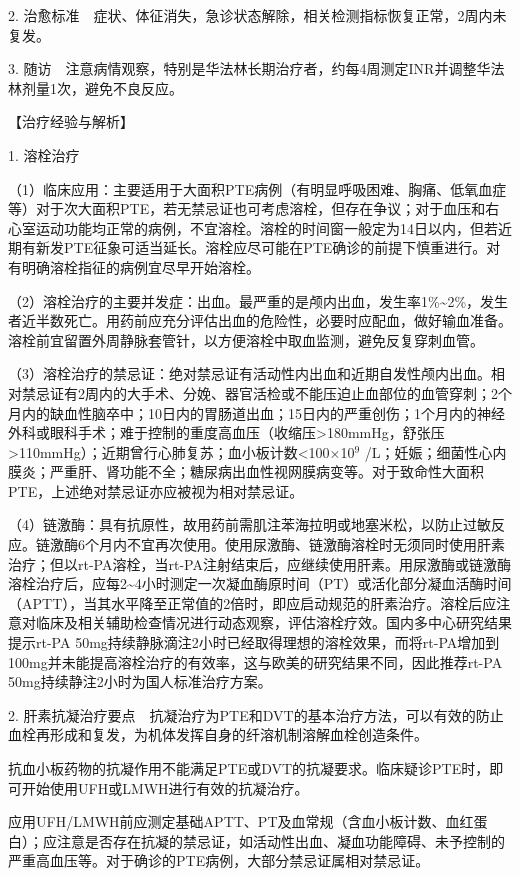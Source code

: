 2.
治愈标准　症状、体征消失，急诊状态解除，相关检测指标恢复正常，2周内未复发。

3.
随访　注意病情观察，特别是华法林长期治疗者，约每4周测定INR并调整华法林剂量1次，避免不良反应。

【治疗经验与解析】

1. 溶栓治疗

（1）临床应用：主要适用于大面积PTE病例（有明显呼吸困难、胸痛、低氧血症等）对于次大面积PTE，若无禁忌证也可考虑溶栓，但存在争议；对于血压和右心室运动功能均正常的病例，不宜溶栓。溶栓的时间窗一般定为14日以内，但若近期有新发PTE征象可适当延长。溶栓应尽可能在PTE确诊的前提下慎重进行。对有明确溶栓指征的病例宜尽早开始溶栓。

（2）溶栓治疗的主要并发症：出血。最严重的是颅内出血，发生率1\%\textasciitilde{}2\%，发生者近半数死亡。用药前应充分评估出血的危险性，必要时应配血，做好输血准备。溶栓前宜留置外周静脉套管针，以方便溶栓中取血监测，避免反复穿刺血管。

（3）溶栓治疗的禁忌证：绝对禁忌证有活动性内出血和近期自发性颅内出血。相对禁忌证有2周内的大手术、分娩、器官活检或不能压迫止血部位的血管穿刺；2个月内的缺血性脑卒中；10日内的胃肠道出血；15日内的严重创伤；1个月内的神经外科或眼科手术；难于控制的重度高血压（收缩压\textgreater{}180mmHg，舒张压\textgreater{}110mmHg）；近期曾行心肺复苏；血小板计数\textless{}100×10$^{9}$
/L；妊娠；细菌性心内膜炎；严重肝、肾功能不全；糖尿病出血性视网膜病变等。对于致命性大面积PTE，上述绝对禁忌证亦应被视为相对禁忌证。

（4）链激酶：具有抗原性，故用药前需肌注苯海拉明或地塞米松，以防止过敏反应。链激酶6个月内不宜再次使用。使用尿激酶、链激酶溶栓时无须同时使用肝素治疗；但以rt-PA溶栓，当rt-PA注射结束后，应继续使用肝素。用尿激酶或链激酶溶栓治疗后，应每2\textasciitilde{}4小时测定一次凝血酶原时间（PT）或活化部分凝血活酶时间（APTT），当其水平降至正常值的2倍时，即应启动规范的肝素治疗。溶栓后应注意对临床及相关辅助检查情况进行动态观察，评估溶栓疗效。国内多中心研究结果提示rt-PA
50mg持续静脉滴注2小时已经取得理想的溶栓效果，而将rt-PA增加到100mg并未能提高溶栓治疗的有效率，这与欧美的研究结果不同，因此推荐rt-PA
50mg持续静注2小时为国人标准治疗方案。

2.
肝素抗凝治疗要点　抗凝治疗为PTE和DVT的基本治疗方法，可以有效的防止血栓再形成和复发，为机体发挥自身的纤溶机制溶解血栓创造条件。

抗血小板药物的抗凝作用不能满足PTE或DVT的抗凝要求。临床疑诊PTE时，即可开始使用UFH或LMWH进行有效的抗凝治疗。

应用UFH/LMWH前应测定基础APTT、PT及血常规（含血小板计数、血红蛋白）；应注意是否存在抗凝的禁忌证，如活动性出血、凝血功能障碍、未予控制的严重高血压等。对于确诊的PTE病例，大部分禁忌证属相对禁忌证。

